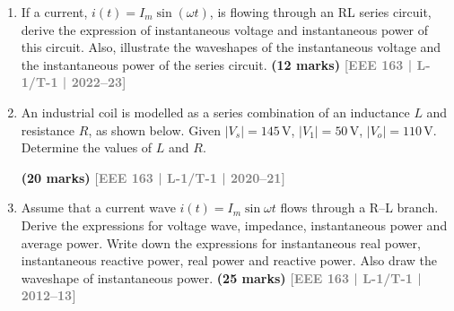 \documentclass[12pt,a3paper]{article}
\newcommand{\yr}[1]{\hfill\textcolor{gray}{\small\textbf{[#1]}}}
\newcommand{\mk}[1]{\textcolor{orange!70!black}{\small\textbf{(#1 marks)}}}
\begin{document}
\begin{enumerate}\item If a current, $i(t) = I_m \sin(\omega t)$, is flowing through an RL series circuit, derive the expression of instantaneous voltage and instantaneous power of this circuit. Also, illustrate the waveshapes of the instantaneous voltage and the instantaneous power of the series circuit.
\mk{12} \yr{EEE 163 | L-1/T-1 | 2022--23}

\item An industrial coil is modelled as a series combination of an inductance $L$ and resistance $R$, as shown below. Given $|V_s| = 145$\,V, $|V_1| = 50$\,V, $|V_o| = 110$\,V. Determine the values of $L$ and $R$.
\begin{center}

\end{center}
\mk{20} \yr{EEE 163 | L-1/T-1 | 2020--21}

\item Assume that a current wave $i(t) = I_m\sin\omega t$ flows through a R--L branch. Derive the expressions for voltage wave, impedance, instantaneous power and average power. Write down the expressions for instantaneous real power, instantaneous reactive power, real power and reactive power. Also draw the waveshape of instantaneous power.
\mk{25} \yr{EEE 163 | L-1/T-1 | 2012--13}


\end{enumerate}
\end{document}
